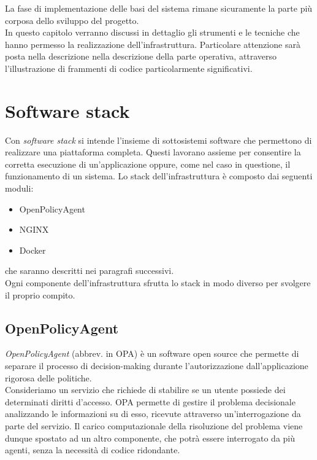 La fase di implementazione delle basi del sistema rimane sicuramente la parte più corposa dello sviluppo del progetto.
\\ In questo capitolo verranno discussi in dettaglio gli strumenti e le tecniche
che hanno permesso la realizzazione dell'infrastruttura. Particolare attenzione sarà posta nella descrizione 
nella descrizione della parte operativa, attraverso l'illustrazione di frammenti di codice particolarmente significativi. 

\section{Software stack}
Con \textit{software stack} si intende l'insieme di sottosistemi software che permettono di realizzare una piattaforma completa.
Questi lavorano assieme per consentire la corretta esecuzione di un'applicazione oppure, come nel caso in questione, il 
funzionamento di un sistema.
Lo stack dell'infrastruttura è composto dai seguenti moduli:
\begin{itemize}
    \item OpenPolicyAgent
    \item NGINX
    \item Docker
\end{itemize}
che saranno descritti nei paragrafi successivi.
\\ Ogni componente dell'infrastruttura sfrutta lo stack in modo diverso per svolgere il proprio compito. 


\subsection{OpenPolicyAgent}
\textit{OpenPolicyAgent} (abbrev. in OPA) è un software open source che permette di separare il processo di decision-making 
durante l'autorizzazione dall'applicazione rigorosa delle politiche.
\\ Consideriamo un servizio che richiede di stabilire se un utente possiede dei determinati diritti d'accesso.
OPA permette di gestire il problema decisionale analizzando le informazioni su di esso, ricevute attraverso un'interrogazione da parte del servizio. 
Il carico computazionale della risoluzione del problema viene dunque spostato ad un altro componente, che potrà essere interrogato da più 
agenti, senza la necessità di codice ridondante. 

